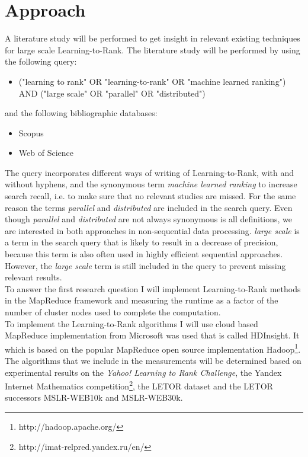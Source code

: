 \chapter{Approach}
A literature study will be performed to get insight in relevant existing techniques for large scale Learning-to-Rank. The literature study will be performed by using the following query:
\begin{itemize}
\item ("learning to rank" OR "learning-to-rank" OR "machine learned ranking") AND ("large scale" OR "parallel" OR "distributed")
\end{itemize}
and the following bibliographic databases:
\begin{itemize}
\item Scopus
\item Web of Science
\end{itemize}

The query incorporates different ways of writing of Learning-to-Rank, with and without hyphens, and the synonymous term \emph{machine learned ranking} to increase search recall, i.e. to make sure that no relevant studies are missed. For the same reason the terms \emph{parallel} and \emph{distributed} are included in the search query. Even though \emph{parallel} and \emph{distributed} are not always synonymous is all definitions, we are interested in both approaches in non-sequential data processing. \emph{large scale} is a term in the search query that is likely to result in a decrease of precision, because this term is also often used in highly efficient sequential approaches. However, the \emph{large scale} term is still included in the query to prevent missing relevant results.\\

To answer the first research question I will implement Learning-to-Rank methods in the MapReduce framework and measuring the runtime as a factor of the number of cluster nodes used to complete the computation.\\

To implement the Learning-to-Rank algorithms I will use cloud based MapReduce implementation from Microsoft was used that is called HDInsight. It which is based on the popular MapReduce open source implementation Hadoop\footnote{http://hadoop.apache.org/}.
The algorithms that we include in the measurements will be determined based on experimental results on the \emph{Yahoo! Learning to Rank Challenge}\cite{Chapelle2011a}, the Yandex Internet Mathematics competition\footnote{http://imat-relpred.yandex.ru/en/}, the LETOR\cite{Qin2010} dataset and the LETOR successors MSLR-WEB10k and MSLR-WEB30k.

